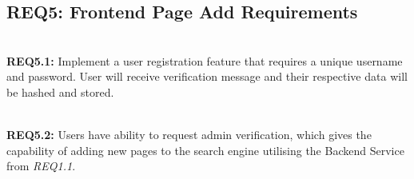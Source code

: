 \subsection{REQ5: Frontend Page Add Requirements}

\textbf{\\REQ5.1:} Implement a user registration feature that requires a unique username and password. User will receive verification message and their respective data will be hashed and stored.\par

\textbf{\\REQ5.2:} Users have ability to request admin verification, which gives the capability of adding new pages to the search engine utilising the Backend Service from \textit{REQ1.1}.\par


